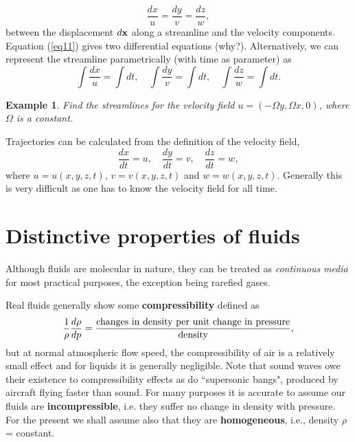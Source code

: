 \documentclass[twoside,a4paper,11pt]{report}
\newtheorem{exmp}{Example}}
\begin{document}
\begin{equation}
\label{eq11}
\frac{dx}{u}=\frac{dy}{v}=\frac{dz}{w},
\end{equation}
between the displacement $d{\bf x}$ along a streamline and the velocity
components. Equation (\ref{eq11}) gives two differential equations (why?).
Alternatively, we can represent the streamline parametrically (with time as
parameter) as
\begin{equation}
\label{eq2}
\int {\frac{dx}{u}} =\int {dt},\quad \int {\frac{dy}{v}} =\int {dt},\quad  \int {\frac{dz}{w}} =\int {dt} .
\end{equation}

\begin{exmp}
Find the streamlines for the velocity field $u=(-\Omega y, \Omega x,0)$, where $\Omega $ is a constant.



\end{exmp}

Trajectories can be calculated from the definition of the velocity field,
\[
\frac{dx}{dt}=u,
\quad
\frac{dy}{dt}=v,
\quad
\frac{dz}{dt}=w,
\]
where $u=u(x,y,z,t)$, $v=v(x,y,z,t)$ and $w=w(x,y,z,t)$. Generally this is
very difficult as one has to know the velocity field for all time.

\section{Distinctive properties of fluids}
Although fluids are molecular in nature, they can be treated as \textit{continuous} \textit{media} for most 
practical purposes, the exception being rarefied gases.

Real fluids generally show some \textbf{compressibility} defined as 
\[
\frac{1}{\rho }\frac{d\rho 
}{dp}=\frac{\hbox{changes in density per unit change in pressure}}{\hbox{density}},
\]
but at normal atmospheric flow speed, the compressibility of air is a 
relatively small effect and for liquids it is generally negligible. Note that 
sound waves owe their existence to compressibility effects as do ``supersonic 
bangs", produced by aircraft flying faster than sound. For many purposes it 
is accurate to assume our fluids are \textbf{incompressible}, i.e. they 
suffer no change in density with pressure. For the present we shall assume 
also that they are \textbf{homogeneous}, i.e., density $\rho $ = constant.
\end{document}
